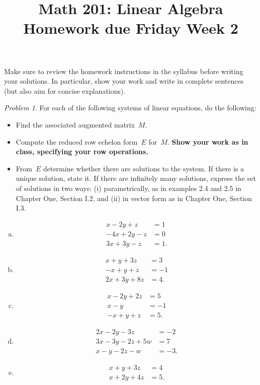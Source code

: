 \documentclass[11pt,twoside]{amsart}
\title{Math 201: Linear Algebra\\ Homework due Friday Week 2}
\theoremstyle{plain}
\theoremstyle{remark}
\newtheorem{prob}{Problem}
\theoremstyle{definition}
\theoremstyle{definition}
\begin{document}
\maketitle

\noindent Make sure to review the homework instructions in the syllabus before writing your solutions. In particular, show your work and write in complete sentences (but also aim for concise explanations).

\begin{prob}
For each of the following systems of linear equations, do the following:
\begin{itemize}
\item Find the associated augmented matrix~$M$.
\item Compute the reduced row echelon form~$E$ for~$M$. {\bf Show your work as in class, specifying your row operations.}
\item From~$E$ determine whether there are solutions to the system.  If there is a unique solution, state it.  If there are infinitely many solutions, express the set of solutions in two ways: (i) parametrically, as in examples 2.4 and 2.5 in Chapter One, Section I.2, and (ii) in vector form as in Chapter One, Section I.3.
\end{itemize}
\begin{enumerate}[(a)]
\item 
\begin{align*}
  x-2y+z&=1\\
  -4x+2y-z&=0\\
  3x+3y-z&=1.
\end{align*}
\item 
\begin{align*}
  x+y+3z&=3\\
  -x+y+z&=-1\\
  2x+3y+8z&=4.
\end{align*}
\item 
\begin{align*}
  x-2y+2z&=5\\
  x-y&=-1\\
  -x+y+z&=5.
\end{align*}
\item 
\begin{align*}
  2x-2y-3z&=-2\\
  3x-3y-2z+5w&=7\\
  x-y-2z-w&=-3.
\end{align*}
  \item
\begin{align*}
  x+y+3z&=4\\
  x+2y+4z&=5.
\end{align*}
\end{enumerate}
\end{prob}
\end{document}
